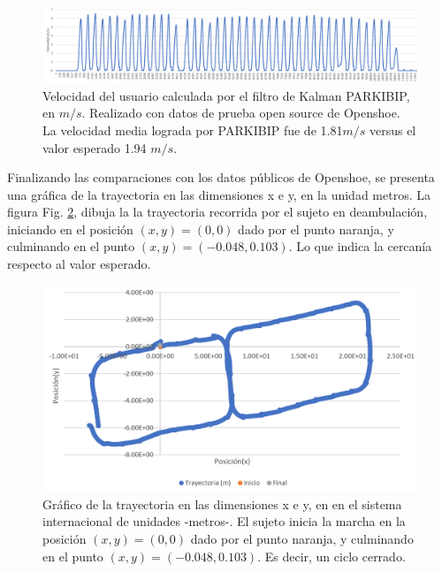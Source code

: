 \begin{figure}[h!]
\hspace*{-2.9cm}%
\includegraphics[clip,width=1.4 \columnwidth]{TESIS/imagenes/chap06/velocity-openshoe.PNG}
\caption{Velocidad del usuario calculada por el filtro de Kalman PARKIBIP, en $m/s$. Realizado con datos de prueba open source de Openshoe. La velocidad media lograda por PARKIBIP fue de 1.81$m/s$ versus el valor esperado 1.94 $m/s$. }
\label{fig:openshoe-velocity}
\end{figure}

Finalizando las comparaciones con los datos públicos de Openshoe, se presenta una gráfica de la trayectoria en las dimensiones x e y, en la unidad metros. La figura Fig. \ref{fig:openshoe-trajectory}, dibuja la la trayectoria recorrida por el sujeto en deambulación, iniciando en el posición $(x,y) =(0,0)$ dado por el punto naranja, y culminando en el punto $(x,y) =(-0.048,0.103)$. Lo que indica la cercanía respecto al valor esperado. 

\begin{figure}[h!]
\hspace*{-2.9cm}%
\includegraphics[clip,width=1.4 \columnwidth]{TESIS/imagenes/chap06/openshoe-trajectory.PNG}
\caption{Gráfico de la trayectoria en las dimensiones x e y, en en el sistema internacional de unidades -metros-. El sujeto inicia la marcha en la posición $(x,y) =(0,0)$ dado por el punto naranja, y culminando en el punto $(x,y) =(-0.048,0.103)$. Es decir, un ciclo cerrado.}
\label{fig:openshoe-trajectory}
\end{figure}

